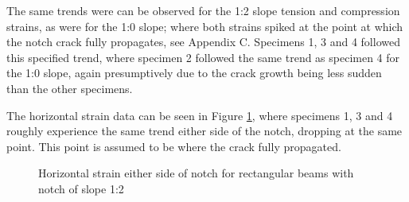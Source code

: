 \documentclass[11pt,a4paper]{article}
\numberwithin{equation}{subsection}
\begin{document}
\vspace*{\baselineskip}

\noindent
The same trends were can be observed for the 1:2 slope tension and compression strains, as were for the 1:0 slope; where both strains spiked at the point at which the notch crack fully propagates, see Appendix C. Specimens 1, 3 and 4 followed this specified trend, where specimen 2 followed the same trend as specimen 4 for the 1:0 slope, again presumptively due to the crack growth being less sudden than the other specimens.

\vspace*{\baselineskip}
\noindent
The horizontal strain data can be seen in Figure \ref{fig:Rect_12_Z}, where specimens 1, 3 and 4 roughly experience the same trend either side of the notch, dropping at the same point. This point is assumed to be where the crack fully propagated.
\vspace*{\baselineskip}

\begin{figure}[h]
	\begin{center}
	\end{center}
	\caption{Horizontal strain either side of notch for rectangular beams with notch of slope 1:2}
	\label{fig:Rect_12_Z}
\end{figure}
\pagebreak
\end{document}
